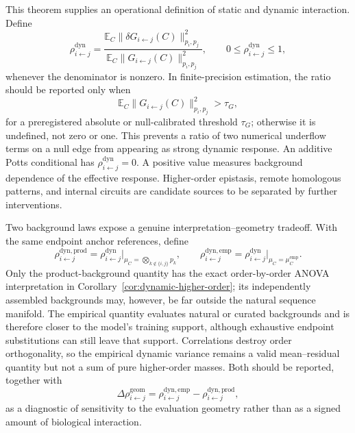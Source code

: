 \documentclass[10pt]{article}
\newcommand{\E}{\mathbb E}
\theoremstyle{definition}
\theoremstyle{remark}
\newcommand{\BookInsert}[1]{}
\begin{document}
\BookInsert{chapters/04_two_background_example}

This theorem supplies an operational definition of static and dynamic interaction.  Define
\begin{equation}
\rho_{i\leftarrow j}^{\mathrm{dyn}}
=\frac{\E_C\|\delta G_{i\leftarrow j}(C)\|_{p_i,p_j}^2}
{\E_C\|G_{i\leftarrow j}(C)\|_{p_i,p_j}^2},
\qquad 0\leq\rho_{i\leftarrow j}^{\mathrm{dyn}}\leq1,
\label{eq:dynamic-fraction}
\end{equation}
whenever the denominator is nonzero.  In finite-precision estimation, the ratio should be reported
only when
\begin{equation}
\E_C\|G_{i\leftarrow j}(C)\|_{p_i,p_j}^2>\tau_G,
\label{eq:dynamic-fraction-threshold}
\end{equation}
for a preregistered absolute or null-calibrated threshold $\tau_G$; otherwise it is undefined, not
zero or one.  This prevents a ratio of two numerical underflow terms on a null edge from appearing
as strong dynamic response.  An additive Potts conditional has
$\rho_{i\leftarrow j}^{\mathrm{dyn}}=0$.  A positive value measures background dependence of the effective
response.  Higher-order epistasis, remote homologous patterns, and internal circuits are candidate
sources to be separated by further interventions.

Two background laws expose a genuine interpretation--geometry tradeoff.  With the same endpoint
anchor references, define
\begin{equation}
\rho_{i\leftarrow j}^{\mathrm{dyn,prod}}
=\rho_{i\leftarrow j}^{\mathrm{dyn}}
\bigg|_{\mu_C=\bigotimes_{k\notin\{i,j\}}p_k},
\qquad
\rho_{i\leftarrow j}^{\mathrm{dyn,emp}}
=\rho_{i\leftarrow j}^{\mathrm{dyn}}
\bigg|_{\mu_C=\mu_C^{\mathrm{emp}}}.
\label{eq:product-empirical-dynamic-fractions}
\end{equation}
Only the product-background quantity has the exact order-by-order ANOVA interpretation in
Corollary~\ref{cor:dynamic-higher-order}; its independently assembled backgrounds may, however, be
far outside the natural sequence manifold.  The empirical quantity evaluates natural or curated
backgrounds and is therefore closer to the model's training support, although exhaustive endpoint
substitutions can still leave that support.  Correlations destroy order orthogonality, so the
empirical dynamic variance remains a valid mean--residual quantity but not a sum of pure
higher-order masses.  Both should be reported, together with
\begin{equation}
\Delta\rho_{i\leftarrow j}^{\mathrm{geom}}
=\rho_{i\leftarrow j}^{\mathrm{dyn,emp}}
-\rho_{i\leftarrow j}^{\mathrm{dyn,prod}},
\label{eq:dynamic-geometry-gap}
\end{equation}
as a diagnostic of sensitivity to the evaluation geometry rather than as a signed amount of
biological interaction.
\end{document}
